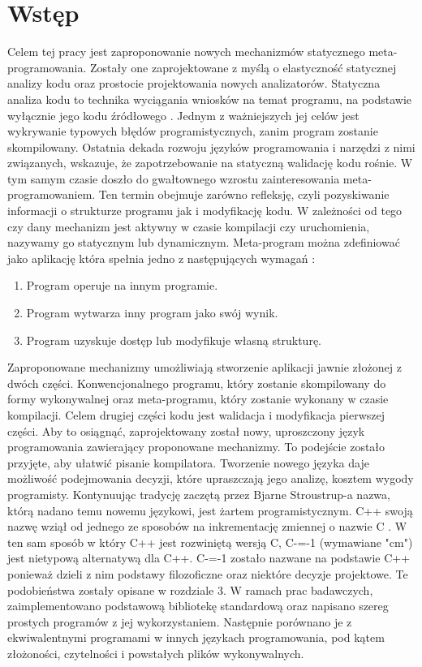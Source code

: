\section{Wstęp}
Celem tej pracy jest zaproponowanie nowych mechanizmów statycznego 
meta-programowania. Zostały one zaprojektowane z myślą o elastyczność statycznej analizy kodu oraz prostocie projektowania nowych analizatorów. 
Statyczna analiza kodu to technika wyciągania wniosków na temat programu, na podstawie wyłącznie jego kodu źródłowego \cite{survey_of_metaprograming}. Jednym z ważniejszych jej celów jest wykrywanie typowych błędów programistycznych, zanim program zostanie skompilowany. Ostatnia dekada rozwoju języków programowania i narzędzi z nimi związanych, wskazuje, że zapotrzebowanie na statyczną walidację kodu rośnie.
W tym samym czasie doszło do gwałtownego wzrostu zainteresowania meta-programowaniem. Ten termin obejmuje zarówno refleksję, czyli pozyskiwanie informacji o strukturze programu jak i modyfikację kodu. W zależności od tego czy dany mechanizm jest aktywny w czasie kompilacji czy uruchomienia, nazywamy go statycznym lub dynamicznym.
Meta-program można zdefiniować jako aplikację która spełnia jedno z następujących wymagań \cite{nielson2004principles}:
\begin{enumerate}
\item Program operuje na innym programie.
\item Program wytwarza inny program jako swój wynik.
\item Program uzyskuje dostęp lub modyfikuje własną strukturę.
\end{enumerate}
Zaproponowane mechanizmy umożliwiają stworzenie aplikacji jawnie złożonej z dwóch części. Konwencjonalnego programu, który zostanie skompilowany do formy wykonywalnej oraz meta-programu, który zostanie wykonany w czasie kompilacji. Celem drugiej części kodu jest walidacja i modyfikacja pierwszej części.
Aby to osiągnąć, zaprojektowany został nowy, uproszczony język programowania zawierający proponowane mechanizmy. To podejście zostało przyjęte, aby ułatwić pisanie kompilatora. Tworzenie nowego języka daje możliwość podejmowania decyzji, które upraszczają jego analizę, kosztem wygody programisty.
Kontynuując tradycję zaczętą przez Bjarne Stroustrup-a nazwa, którą nadano temu nowemu językowi, jest żartem programistycznym. C++ swoją nazwę wziął od jednego ze sposobów na inkrementację zmiennej o nazwie C \cite{stroustrup_com}. W ten sam sposób w który C++ jest rozwiniętą wersją C, C-=-1 (wymawiane "cm") jest nietypową alternatywą dla C++. C-=-1 zostało nazwane na podstawie C++ ponieważ dzieli z nim podstawy filozoficzne oraz niektóre decyzje projektowe. Te podobieństwa zostały opisane w rozdziale 3.
W ramach prac badawczych, zaimplementowano podstawową bibliotekę standardową oraz napisano szereg prostych programów z jej wykorzystaniem. Następnie porównano je z ekwiwalentnymi programami w innych językach programowania, pod kątem złożoności, czytelności i powstałych plików wykonywalnych.

